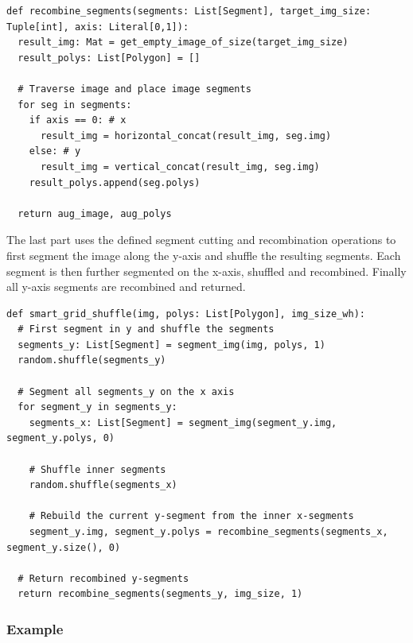 \documentclass[10pt]{book}
\newenvironment{code}{\captionsetup{type=listing}}{}
\begin{document}
\begin{code}
\label{lst:sgs_comb}
\begin{verbatim}
def recombine_segments(segments: List[Segment], target_img_size: Tuple[int], axis: Literal[0,1]):
  result_img: Mat = get_empty_image_of_size(target_img_size)
  result_polys: List[Polygon] = []

  # Traverse image and place image segments
  for seg in segments:
    if axis == 0: # x
      result_img = horizontal_concat(result_img, seg.img)
    else: # y
      result_img = vertical_concat(result_img, seg.img)
    result_polys.append(seg.polys)
    
  return aug_image, aug_polys
\end{verbatim}
\end{code}

The last part uses the defined segment cutting and recombination operations to first segment the image along the y-axis and shuffle the resulting segments. Each segment is then further segmented on the x-axis, shuffled and recombined. Finally all y-axis segments are recombined and returned.

\begin{code}
\label{lst:sgs_main}
\begin{verbatim}
def smart_grid_shuffle(img, polys: List[Polygon], img_size_wh):
  # First segment in y and shuffle the segments
  segments_y: List[Segment] = segment_img(img, polys, 1)
  random.shuffle(segments_y)

  # Segment all segments_y on the x axis
  for segment_y in segments_y:
    segments_x: List[Segment] = segment_img(segment_y.img, segment_y.polys, 0)
    
    # Shuffle inner segments
    random.shuffle(segments_x)
    
    # Rebuild the current y-segment from the inner x-segments
    segment_y.img, segment_y.polys = recombine_segments(segments_x, segment_y.size(), 0)

  # Return recombined y-segments
  return recombine_segments(segments_y, img_size, 1)
\end{verbatim}
\end{code}

\subsubsection{Example}
\end{document}
